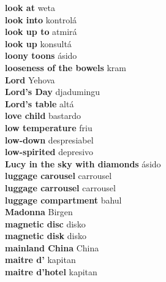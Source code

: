 \textbf{ look at  } weta \\
\textbf{ look into  } kontrolá \\
\textbf{ look up to  } atmirá \\
\textbf{ look up  } konsultá \\
\textbf{ loony toons  } ásido \\
\textbf{ looseness of the bowels  } kram \\
\textbf{ Lord  } Yehova \\
\textbf{ Lord’s Day  } djadumingu \\
\textbf{ Lord’s table  } altá \\
\textbf{ love child  } bastardo \\
\textbf{ low temperature  } friu \\
\textbf{ low-down  } despresiabel \\
\textbf{ low-spirited  } depresivo \\
\textbf{ Lucy in the sky with diamonds  } ásido \\
\textbf{ luggage carousel  } carrousel \\
\textbf{ luggage carrousel  } carrousel \\
\textbf{ luggage compartment  } bahul \\
\textbf{ Madonna  } Birgen \\
\textbf{ magnetic disc  } disko \\
\textbf{ magnetic disk  } disko \\
\textbf{ mainland China  } China \\
\textbf{ maitre d’  } kapitan \\
\textbf{ maitre d’hotel  } kapitan \\
